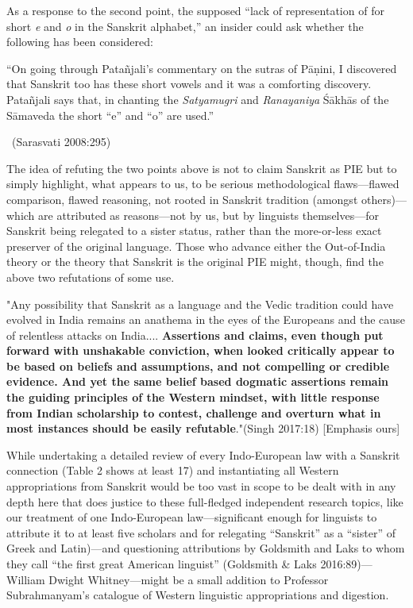 As a response to the second point, the supposed “lack of representation of for short \textit{e} and \textit{o} in the Sanskrit alphabet,” an insider could ask whether the following has been considered:

\begin{myquote}
“On going through Patañjali’s commentary on the sutras of Pāṇini, I discovered that Sanskrit too has these short vowels and it was a comforting discovery. Patañjali says that, in chanting the \textit{Satyamugri} and \textit{Ranayaniya} Śākhās of the Sāmaveda the short “e” and “o” are used.” 

~\hfill (Sarasvati 2008:295)
\end{myquote}

The idea of refuting the two points above is not to claim Sanskrit as PIE but to simply highlight, what appears to us, to be serious methodological flaws—flawed comparison, flawed reasoning, not rooted in Sanskrit tradition (amongst others)—which are attributed as reasons—not by us, but by linguists themselves—for Sanskrit being relegated to a sister status, rather than the more-or-less exact preserver of the original language. Those who advance either the Out-of-India theory or the theory that Sanskrit is the original PIE might, though, find the above two refutations of some use.

\begin{myquote}
"Any possibility that Sanskrit as a language and the Vedic tradition could have evolved in India remains an anathema in the eyes of the Europeans and the cause of relentless attacks on India.... \textbf{Assertions and claims, even though put forward with unshakable conviction, when looked critically appear to be based on beliefs and assumptions, and not compelling or credible evidence. And yet the same belief based dogmatic assertions remain the guiding principles of the Western mindset, with little response from Indian scholarship to contest, challenge and overturn what in most instances should be easily refutable}."\hfill (Singh 2017:18) [Emphasis ours]
\end{myquote}

While undertaking a detailed review of every Indo-European law with a Sanskrit connection (Table 2 shows at least 17) and instantiating all Western appropriations from Sanskrit would be too vast in scope to be dealt with in any depth here that does justice to these full-fledged independent research topics, like our treatment of one Indo-European law—significant enough for linguists to attribute it to at least five scholars and for relegating “Sanskrit” as a “sister” of Greek and Latin)—and questioning attributions by Goldsmith and Laks to whom they call “the first great American linguist” (Goldsmith \& Laks 2016:89)—William Dwight Whitney—might be a small addition to Professor Subrahmanyam’s catalogue of Western linguistic appropriations and digestion.


